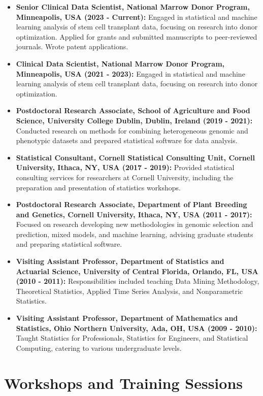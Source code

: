\documentclass[11pt,a4paper,]{moderncv}
\providecommand{\tightlist}{%
	\setlength{\itemsep}{0pt}\setlength{\parskip}{0pt}}
\begin{document}
\begin{itemize}
\tightlist
\item
  \textbf{Senior Clinical Data Scientist, National Marrow Donor Program,
  Minneapolis, USA (2023 - Current):} Engaged in statistical and machine
  learning analysis of stem cell transplant data, focusing on research
  into donor optimization. Applied for grants and submitted manuscripts
  to peer-reviewed journals. Wrote patent applications.
\item
  \textbf{Clinical Data Scientist, National Marrow Donor Program,
  Minneapolis, USA (2021 - 2023):} Engaged in statistical and machine
  learning analysis of stem cell transplant data, focusing on research
  into donor optimization.
\item
  \textbf{Postdoctoral Research Associate, School of Agriculture and
  Food Science, University College Dublin, Dublin, Ireland (2019 -
  2021):} Conducted research on methods for combining heterogeneous
  genomic and phenotypic datasets and prepared statistical software for
  data analysis.
\item
  \textbf{Statistical Consultant, Cornell Statistical Consulting Unit,
  Cornell University, Ithaca, NY, USA (2017 - 2019):} Provided
  statistical consulting services for researchers at Cornell University,
  including the preparation and presentation of statistics workshops.
\item
  \textbf{Postdoctoral Research Associate, Department of Plant Breeding
  and Genetics, Cornell University, Ithaca, NY, USA (2011 - 2017):}
  Focused on research developing new methodologies in genomic selection
  and prediction, mixed models, and machine learning, advising graduate
  students and preparing statistical software.
\item
  \textbf{Visiting Assistant Professor, Department of Statistics and
  Actuarial Science, University of Central Florida, Orlando, FL, USA
  (2010 - 2011):} Responsibilities included teaching Data Mining
  Methodology, Theoretical Statistics, Applied Time Series Analysis, and
  Nonparametric Statistics.
\item
  \textbf{Visiting Assistant Professor, Department of Mathematics and
  Statistics, Ohio Northern University, Ada, OH, USA (2009 - 2010):}
  Taught Statistics for Professionals, Statistics for Engineers, and
  Statistical Computing, catering to various undergraduate levels.
\end{itemize}

\section{Workshops and Training
Sessions}\label{workshops-and-training-sessions}
\end{document}

